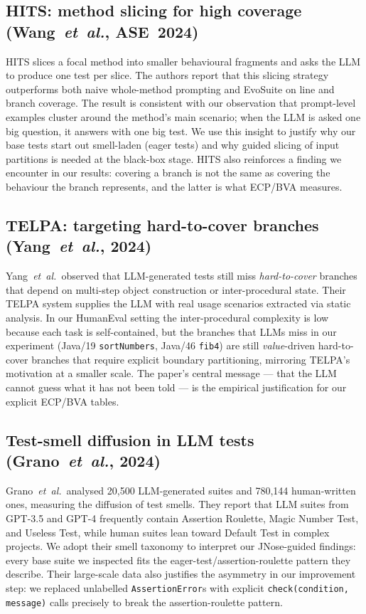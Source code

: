 \documentclass[journal]{IEEEtran}
\begin{document}
\subsection{HITS: method slicing for high coverage
(Wang~\emph{et~al.}, ASE~2024)~\cite{wang2024hits}}
HITS slices a focal method into smaller behavioural fragments
and asks the LLM to produce one test per slice. The authors
report that this slicing strategy outperforms both naive
whole-method prompting and EvoSuite on line and branch
coverage. The result is consistent with our observation that
prompt-level examples cluster around the method's main
scenario; when the LLM is asked one big question, it answers
with one big test. We use this insight to justify why our base
tests start out smell-laden (eager tests) and why guided
slicing of input partitions is needed at the black-box stage.
HITS also reinforces a finding we encounter in our results:
covering a branch is not the same as covering the behaviour
the branch represents, and the latter is what ECP/BVA
measures.

\subsection{TELPA: targeting hard-to-cover branches
(Yang~\emph{et~al.}, 2024)~\cite{yang2024telpa}}
Yang~\emph{et~al.}\ observed that LLM-generated tests still
miss \emph{hard-to-cover} branches that depend on multi-step
object construction or inter-procedural state. Their TELPA
system supplies the LLM with real usage scenarios extracted
via static analysis. In our HumanEval setting the
inter-procedural complexity is low because each task is
self-contained, but the branches that LLMs miss in our
experiment (Java/19 \texttt{sortNumbers}, Java/46
\texttt{fib4}) are still \emph{value}-driven hard-to-cover
branches that require explicit boundary partitioning,
mirroring TELPA's motivation at a smaller scale. The paper's
central message --- that the LLM cannot guess what it has not
been told --- is the empirical justification for our explicit
ECP/BVA tables.

\subsection{Test-smell diffusion in LLM tests
(Grano~\emph{et~al.}, 2024)~\cite{grano2024testsmells}}
Grano~\emph{et~al.}\ analysed 20{,}500 LLM-generated suites
and 780{,}144 human-written ones, measuring the diffusion of
test smells. They report that LLM suites from GPT-3.5 and
GPT-4 frequently contain Assertion Roulette, Magic Number
Test, and Useless Test, while human suites lean toward Default
Test in complex projects. We adopt their smell taxonomy to
interpret our JNose-guided findings: every base suite we
inspected fits the eager-test/assertion-roulette pattern they
describe. Their large-scale data also justifies the asymmetry
in our improvement step: we replaced unlabelled
\texttt{AssertionError}s with explicit
\texttt{check(condition, message)} calls precisely to break
the assertion-roulette pattern.
\end{document}

